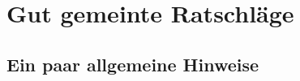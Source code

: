 \documentclass[a4paper,11pt,bibliography=totoc,listof=totoc,headinclude=true,cleardoublepage=empty,oneside]{scrbook}
\begin{document}
\chapter{Gut gemeinte Ratschläge}
\label{chapter:auxiliary}

\section{Ein paar allgemeine Hinweise}
\end{document}
